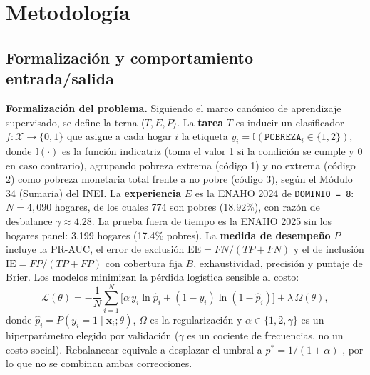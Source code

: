 \section{Metodología}

\subsection{Formalización y comportamiento entrada/salida}

\textbf{Formalización del problema.} Siguiendo el marco canónico de aprendizaje supervisado, se define la terna $\langle T, E, P \rangle$. La \textbf{tarea} $T$ es inducir un clasificador $f:\mathcal{X}\rightarrow\{0,1\}$ que asigne a cada hogar $i$ la etiqueta $y_i = \mathbb{I}(\texttt{POBREZA}_i \in \{1,2\})$, donde $\mathbb{I}(\cdot)$ es la función indicatriz (toma el valor 1 si la condición se cumple y 0 en caso contrario), agrupando pobreza extrema (código 1) y no extrema (código 2) como pobreza monetaria total frente a no pobre (código 3), según el Módulo 34 (Sumaria) del INEI. La \textbf{experiencia} $E$ es la ENAHO 2024 de \texttt{DOMINIO = 8}: $N = 4{,}090$ hogares, de los cuales 774 son pobres (18.92\%), con razón de desbalance $\gamma \approx 4.28$. La prueba fuera de tiempo es la ENAHO 2025 sin los hogares panel: 3,199 hogares (17.4\% pobres). La \textbf{medida de desempeño} $P$ incluye la PR-AUC, el error de exclusión $\mathrm{EE} = FN/(TP+FN)$ y el de inclusión $\mathrm{IE} = FP/(TP+FP)$ con cobertura fija $B$, exhaustividad, precisión y puntaje de Brier. Los modelos minimizan la pérdida logística sensible al costo:
\begin{equation}
\mathcal{L}(\theta) = -\frac{1}{N}\sum_{i=1}^{N}\bigl[\alpha\, y_i \ln \hat{p}_i + (1-y_i)\ln(1-\hat{p}_i)\bigr] + \lambda\,\Omega(\theta),
\end{equation}
donde $\hat{p}_i = P(y_i = 1 \mid \mathbf{x}_i;\theta)$, $\Omega$ es la regularización y $\alpha \in \{1, 2, \gamma\}$ es un hiperparámetro elegido por validación ($\gamma$ es un cociente de frecuencias, no un costo social). Rebalancear equivale a desplazar el umbral a $p^* = 1/(1+\alpha)$ \cite{elkan2001foundations}, por lo que no se combinan ambas correcciones.

